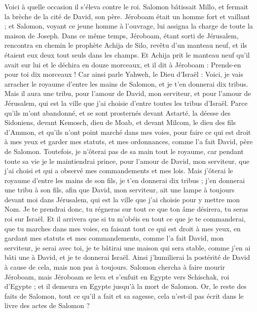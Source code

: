 \begin{multicols}{2}
Voici à quelle occasion il s'éleva contre le roi. Salomon bâtissait Millo, et fermait la brèche de la cité de David, son père.
Jéroboam était un homme fort et vaillant ; et Salomon, voyant ce jeune homme à l’ouvrage, lui assigna la charge de toute la maison de Joseph.
Dans ce même temps, Jéroboam, étant sorti de Jérusalem, rencontra en chemin le prophète Achija de Silo, revêtu d'un manteau neuf, et ils étaient eux deux tout seuls dans les champs.
Et Achija prit le manteau neuf qu'il avait sur lui et le déchira en douze morceaux,
et il dit à Jéroboam : Prends-en pour toi dix morceaux ! Car ainsi parle Yahweh, le Dieu d'Israël : Voici, je vais arracher le royaume d'entre les mains de Salomon, et je t'en donnerai dix tribus.
Mais il aura une tribu, pour l'amour de David, mon serviteur, et pour l'amour de Jérusalem, qui est la ville que j'ai choisie d'entre toutes les tribus d'Israël.
Parce qu'ils m'ont abandonné, et se sont prosternés devant Astarté, la déesse des Sidoniens, devant Kemosch, dieu de Moab, et devant Milcom, le dieu des fils d’Ammon, et qu'ils n'ont point marché dans mes voies, pour faire ce qui est droit à mes yeux et garder mes statuts, et mes ordonnances, comme l’a fait David, père de Salomon.
Toutefois, je n'ôterai pas de sa main tout le royaume, car pendant toute sa vie je le maintiendrai prince, pour l'amour de David, mon serviteur, que j'ai choisi et qui a observé mes commandements et mes lois.
Mais j'ôterai le royaume d'entre les mains de son fils, je t'en donnerai dix tribus ;
j'en donnerai une tribu à son fils, afin que David, mon serviteur, ait une lampe à toujours devant moi dans Jérusalem, qui est la ville que j'ai choisie pour y mettre mon Nom.
Je te prendrai donc, tu régneras sur tout ce que ton âme désirera, tu seras roi sur Israël.
Et il arrivera que si tu m'obéis en tout ce que je te commanderai, que tu marches dans mes voies, en faisant tout ce qui est droit à mes yeux, en gardant mes statuts et mes commandements, comme l’a fait David, mon serviteur, je serai avec toi, je te bâtirai une maison qui sera stable, comme j'en ai bâti une à David, et je te donnerai Israël.
Ainsi j’humilierai la postérité de David à cause de cela, mais non pas à toujours.
Salomon chercha à faire mourir Jéroboam, mais Jéroboam se leva et s'enfuit en Egypte vers Schischak, roi d'Egypte ; et il demeura en Egypte jusqu'à la mort de Salomon.
Or, le reste des faits de Salomon, tout ce qu'il a fait et sa sagesse, cela n'est-il pas écrit dans le livre des actes de Salomon ?

\end{multicols}
